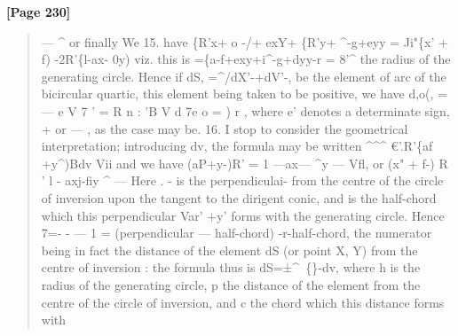 \documentclass[11pt,a4paper]{book}
\begin{document}
\textbf{[Page 230]}\\[0.2cm]
\begin{quote}
---
\textasciicircum{}
or finally
We
15. have
\{R'x+ o -/+ exY+ \{R'y+ \textasciicircum{}-g+eyy
= Ji"\{x' + f) -2R'\{l-ax- 0y)
viz. this is
=\{a-f+exy+i\textasciicircum{}-g+dyy-r
=
8'\textasciicircum{} the radius of the generating circle.
Hence if dS, =\textasciicircum{}/dX'-+dV'-, be the element of arc of the bicircular quartic, this
element being taken to be positive, we have
d,o(, = --- e V 7 ' = R n : 'B V d 7e o = ) r ,
where e' denotes a determinate sign, + or --- , as the case may be.
16. I stop to consider the geometrical interpretation; introducing dv, the formula
may be written
\textasciicircum{}\textasciicircum{}\textasciicircum{} €'.R'\{af +y\textasciicircum{})Bdv
Vii
and we have (aP+y-)R' = 1 ---ax--- \textasciicircum{}y --- Vfl, or
(x" + f-) R ' l - axj-fiy \textasciicircum{}
---
Here . - is the perpendiculai- from the centre of the circle of inversion upon
the tangent to the dirigent conic, and is the half-chord which this perpendicular
Var'
+y'
forms with the generating circle. Hence 7=- - --- 1 = (perpendicular --- half-chord)
-r-half-chord, the numerator being in fact the distance of the element dS (or point
X, Y) from the centre of inversion : the formula thus is
dS=±\textasciicircum{}~\{\}-dv,
where h is the radius of the generating circle, p the distance of the element from
the centre of the circle of inversion, and c the chord which this distance forms with
\end{quote}
\end{document}
